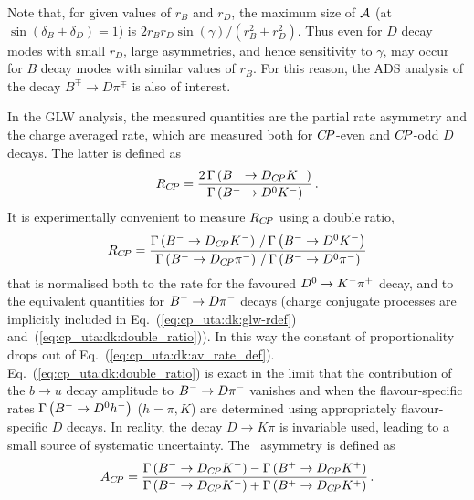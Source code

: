 Note that, for given values of $r_B$ and $r_D$, 
the maximum size of ${\cal A}$ (at $\sin \left( \delta_B + \delta_D \right) = 1$)
is $2 r_B r_D \sin \left( \gamma \right) / \left( r_B^2 + r_D^2 \right)$.
Thus even for $D$ decay modes with small $r_D$, 
large asymmetries, and hence sensitivity to $\gamma$, 
may occur for $B$ decay modes with similar values of $r_B$.
For this reason, the ADS analysis of the decay $B^\mp \to D \pi^\mp$ 
is also of interest.

In the GLW analysis, the measured quantities are the 
partial rate asymmetry and the charge averaged rate,
which are measured both for $C\!P$-even and $C\!P$-odd $D$ decays.
The latter is defined as 
\begin{equation}
  \label{eq:cp_uta:dk:glw-rdef}
  R_{C\!P} = 
  \frac{2 \, \Gamma \left( B^{-} \to D_{C\!P} K^-  \right)}
  {\Gamma\left( B^{-} \to D^0 K^- \right)} \, .
\end{equation}
It is experimentally convenient to measure $R_{C\!P}$ using a double ratio,
\begin{equation}
  \label{eq:cp_uta:dk:double_ratio}
  R_{C\!P} = 
  \frac{
    \Gamma\left( B^{-} \to D_{C\!P} K^-  \right) \, / \, \Gamma\left( B^{-} \to D^0 K^- \right)
  }{
    \Gamma\left( B^{-} \to D_{C\!P} \pi^- \right) \, / \, \Gamma\left( B^{-} \to D^0 \pi^- \right)
  }
\end{equation}
that is normalised both to the rate for the favoured $D^0 \to K^-\pi^+$ decay, 
and to the equivalent quantities for $B^{-} \to D\pi^-$ decays
(charge conjugate processes are implicitly included in 
Eq.~(\ref{eq:cp_uta:dk:glw-rdef}) and~(\ref{eq:cp_uta:dk:double_ratio})).
In this way the constant of proportionality drops out of 
Eq.~(\ref{eq:cp_uta:dk:av_rate_def}).
Eq.~(\ref{eq:cp_uta:dk:double_ratio}) is exact in the limit that the
contribution of the $b \to u$ decay amplitude to $B^{-} \to D \pi^-$ vanishes and
when the flavour-specific rates $\Gamma\left( B^{-} \to D^0 h^- \right)$ ($h =
\pi,K$) are determined using appropriately flavour-specific $D$ decays.
In reality, the decay $D \to K\pi$ is invariable used, leading to a small source of systematic uncertainty.
The \CP\ asymmetry is defined as
\begin{equation}
  \label{eq:cp_uta:dk:glw-adef}
  A_{C\!P} = \frac{
    \Gamma\left(B^{-}\to D_{C\!P}K^-\right) - \Gamma\left(B^{+}\to D_{C\!P}K^+\right)
  }{
    \Gamma\left(B^{-}\to D_{C\!P}K^-\right) + \Gamma\left(B^{+}\to D_{C\!P}K^+\right)
  } \, .
\end{equation}

